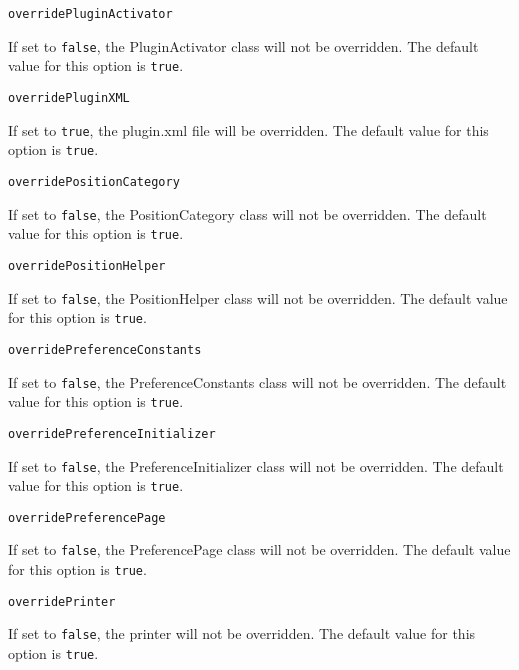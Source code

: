 \noindent\texttt{overridePluginActivator}
\begin{myindentpar}{1cm}
If set to \texttt{false}, the PluginActivator class will not be overridden. The default value for this option is \texttt{true}.
\end{myindentpar}

\noindent\texttt{overridePluginXML}
\begin{myindentpar}{1cm}
If set to \texttt{true}, the plugin.xml file will be overridden. The default value for this option is \texttt{true}.
\end{myindentpar}

\noindent\texttt{overridePositionCategory}
\begin{myindentpar}{1cm}
If set to \texttt{false}, the PositionCategory class will not be overridden. The default value for this option is \texttt{true}.
\end{myindentpar}

\noindent\texttt{overridePositionHelper}
\begin{myindentpar}{1cm}
If set to \texttt{false}, the PositionHelper class will not be overridden. The default value for this option is \texttt{true}.
\end{myindentpar}

\noindent\texttt{overridePreferenceConstants}
\begin{myindentpar}{1cm}
If set to \texttt{false}, the PreferenceConstants class will not be overridden. The default value for this option is \texttt{true}.
\end{myindentpar}

\noindent\texttt{overridePreferenceInitializer}
\begin{myindentpar}{1cm}
If set to \texttt{false}, the PreferenceInitializer class will not be overridden. The default value for this option is \texttt{true}.
\end{myindentpar}

\noindent\texttt{overridePreferencePage}
\begin{myindentpar}{1cm}
If set to \texttt{false}, the PreferencePage class will not be overridden. The default value for this option is \texttt{true}.
\end{myindentpar}

\noindent\texttt{overridePrinter}
\begin{myindentpar}{1cm}
If set to \texttt{false}, the printer will not be overridden. The default value for this option is \texttt{true}.
\end{myindentpar}

